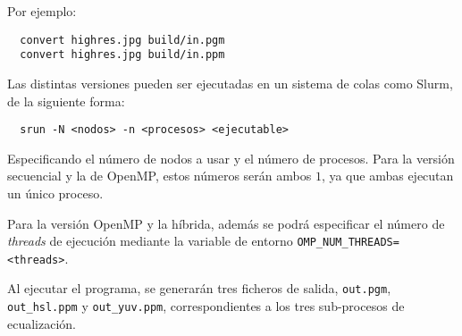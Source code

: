 \noindent
Por ejemplo:
\begin{verbatim}
  convert highres.jpg build/in.pgm
  convert highres.jpg build/in.ppm
\end{verbatim}


Las distintas versiones pueden ser ejecutadas en un sistema de colas como Slurm, de la siguiente forma:
\begin{verbatim}
  srun -N <nodos> -n <procesos> <ejecutable>
\end{verbatim}

Especificando el número de nodos a usar y el número de procesos. Para la versión secuencial y la de OpenMP, estos números serán ambos $1$, ya que ambas ejecutan un único proceso.

Para la versión OpenMP y la híbrida, además se podrá especificar el número de \textit{threads} de ejecución mediante la variable de entorno \texttt{OMP\_NUM\_THREADS=<threads>}.

Al ejecutar el programa, se generarán tres ficheros de salida, \texttt{out.pgm}, \texttt{out\_hsl.ppm} y \texttt{out\_yuv.ppm}, correspondientes a los tres sub-procesos de ecualización.